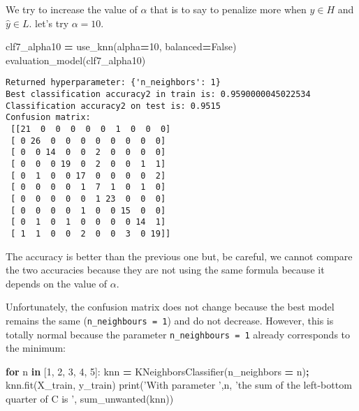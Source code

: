 \documentclass[10pt,a4paper]{article}
\newenvironment{Shaded}{\begin{snugshade}}{\end{snugshade}}
\newcommand{\BuiltInTok}[1]{#1}
\newcommand{\ControlFlowTok}[1]{\textcolor[rgb]{0.13,0.29,0.53}{\textbf{#1}}}
\newcommand{\DecValTok}[1]{\textcolor[rgb]{0.00,0.00,0.81}{#1}}
\newcommand{\KeywordTok}[1]{\textcolor[rgb]{0.13,0.29,0.53}{\textbf{#1}}}
\newcommand{\NormalTok}[1]{#1}
\newcommand{\OperatorTok}[1]{\textcolor[rgb]{0.81,0.36,0.00}{\textbf{#1}}}
\newcommand{\StringTok}[1]{\textcolor[rgb]{0.31,0.60,0.02}{#1}}
\newcommand{\VariableTok}[1]{\textcolor[rgb]{0.00,0.00,0.00}{#1}}
\theoremstyle{break}
\begin{document}
We try to increase the value of \(\alpha\) that is to say to penalize more when \(y \in H\) and \(\hat{y} \in L\). let's try \(\alpha=10\).

\begin{Shaded}
\begin{Highlighting}[]
\NormalTok{clf7_alpha10 }\OperatorTok{=}\NormalTok{ use_knn(alpha}\OperatorTok{=}\DecValTok{10}\NormalTok{, balanced}\OperatorTok{=}\VariableTok{False}\NormalTok{)}
\NormalTok{evaluation_model(clf7_alpha10)}
\end{Highlighting}
\end{Shaded}

\begin{verbatim}
Returned hyperparameter: {'n_neighbors': 1}
Best classification accuracy2 in train is: 0.9590000045022534
Classification accuracy2 on test is: 0.9515
Confusion matrix: 
 [[21  0  0  0  0  0  1  0  0  0]
 [ 0 26  0  0  0  0  0  0  0  0]
 [ 0  0 14  0  0  2  0  0  0  0]
 [ 0  0  0 19  0  2  0  0  1  1]
 [ 0  1  0  0 17  0  0  0  0  2]
 [ 0  0  0  0  1  7  1  0  1  0]
 [ 0  0  0  0  0  1 23  0  0  0]
 [ 0  0  0  0  1  0  0 15  0  0]
 [ 0  1  0  1  0  0  0  0 14  1]
 [ 1  1  0  0  2  0  0  3  0 19]]
\end{verbatim}

The accuracy is better than the previous one but, be careful, we cannot compare the two accuracies because they are not using the same formula because it depends on the value of \(\alpha\).

Unfortunately, the confusion matrix does not change because the best model remains the same (\texttt{n\_neighbours\ =\ 1}) and do not decrease. However, this is totally normal because the parameter \texttt{n\_neighbours\ =\ 1} already corresponds to the minimum:

\begin{Shaded}
\begin{Highlighting}[]
\ControlFlowTok{for}\NormalTok{ n }\KeywordTok{in}\NormalTok{ [}\DecValTok{1}\NormalTok{, }\DecValTok{2}\NormalTok{, }\DecValTok{3}\NormalTok{, }\DecValTok{4}\NormalTok{, }\DecValTok{5}\NormalTok{]:}
\NormalTok{    knn }\OperatorTok{=}\NormalTok{ KNeighborsClassifier(n_neighbors }\OperatorTok{=}\NormalTok{ n)}\OperatorTok{;}
\NormalTok{    knn.fit(X_train, y_train)}
    \BuiltInTok{print}\NormalTok{(}\StringTok{'With parameter '}\NormalTok{,n, }\StringTok{'the sum of the left-bottom quarter of C is '}\NormalTok{, sum_unwanted(knn))}
\end{Highlighting}
\end{Shaded}
\end{document}
